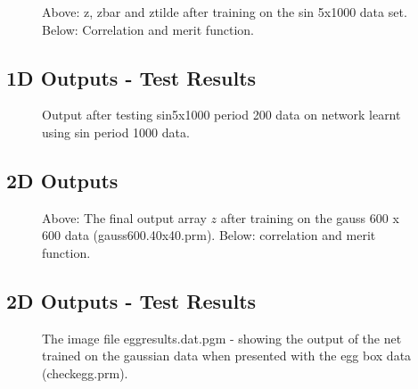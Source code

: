 \documentclass[a4paper]{article}
\providecommand{\psfig}[1]{}
\begin{document}
\begin{figure}[h!]
\centerline{\psfig{figure=/rsunq/vision/stephene/dispruns/testthencheck/sin5x1000/sintrainz.ps,width=300pt}}
\centerline{\psfig{figure=/rsunq/vision/stephene/dispruns/testthencheck/sin5x1000/sintraincorrn.ps,width=300pt}}
\caption{Above: z, zbar and ztilde after training on the sin 5x1000
  data set. Below: Correlation and merit function.}
\label{sintrain.p}
\end{figure}

\clearpage

\subsection*{1D Outputs - Test Results}
\begin{figure}[h!]
  \centerline{\psfig{figure=/rsunq/vision/stephene/dispruns/testthencheck/sin5x1000/sintestz.ps,width=300pt}}
\caption{Output after testing sin5x1000 period 200 data on network
  learnt using sin period 1000 data.}
\label{sintest.p}
\end{figure}

\clearpage



\subsection{2D Outputs}


\begin{figure}[h!]
  \centerline{\psfig{figure=/rsunq/vision/stephene/dispruns/testthencheck/gauss600.40x40/z.1000.ps,width=300pt}}
  \vspace{0.3cm}
  \centerline{\psfig{figure=/rsunq/vision/stephene/dispruns/testthencheck/gauss600.40x40/gausscorrn.ps,width=300pt}}
  \caption{Above: The final output array $z$ after training on the gauss 600 x
    600 data (gauss600.40x40.prm).  Below: correlation and merit function.}
  \label{gausstrain.p}
\end{figure}

\clearpage

\subsection*{2D Outputs - Test Results}

\begin{figure}[h!]
\centerline{\psfig{figure=/rsunq/vision/stephene/dispruns/testthencheck/gauss600.40x40/eggresults.dat.ps,width=300pt}}
\caption{The image file eggresults.dat.pgm - showing the output of the net
  trained on the gaussian data when presented with the egg box data (checkegg.prm).}

\label{gausstest.p}
\end{figure}
\end{document}
